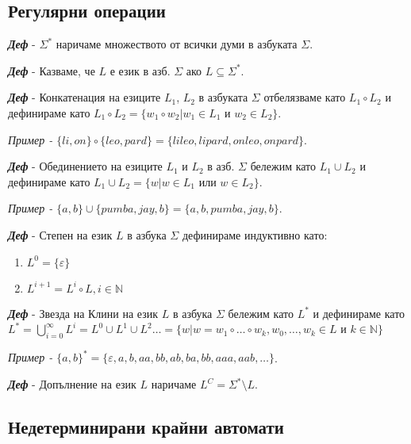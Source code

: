 \documentclass[fleqn,12pt]{article}
\begin{document}
\begin{flushleft}

\subsection{Регулярни операции}

\textit{\textbf{Деф}} - $\Sigma^*$ наричаме множеството от всички думи в азбуката $\Sigma$.

\textit{\textbf{Деф}} - Казваме, че $L$ е език в азб. $\Sigma$ ако $L \subseteq \Sigma^*$.

\textit{\textbf{Деф}} - Конкатенация на езиците $L_1$, $L_2$ в азбуката $\Sigma$ отбелязваме като $L_1 \circ L_2$ и дефинираме като $L_1 \circ L_2 = \{w_1 \circ w_2 | w_1 \in L_1 $ и $ w_2 \in L_2\}$.

\textit{Пример - $\{li, on\} \circ \{leo, pard\} = \{lileo, lipard, onleo, onpard\}$}.

\textit{\textbf{Деф}} - Обединението на езиците $L_1$ и $L_2$ в азб. $\Sigma$ бележим като $L_1 \cup L_2$ и дефинираме като $L_1 \cup L_2 = \{w | w \in L_1 $ или $ w \in L_2\}$.

\textit{Пример - $\{a, b\} \cup \{pumba, jay, b\} = \{a, b, pumba, jay, b\}$}.

\textit{\textbf{Деф}} - Степен на език $L$ в азбука $\Sigma$ дефинираме индуктивно като:
\begin{enumerate}
    \item $L^0 = \{\varepsilon\}$
    \item $L^{i+1} = L^i \circ L, i \in \mathbb{N}$
\end{enumerate}

\textit{\textbf{Деф}} - Звезда на Клини на език $L$ в азбука $\Sigma$ бележим като $L^*$ и дефинираме като $L^* = \bigcup\limits_{i=0}^{\infty} L^{i} = L^0 \cup L^1 \cup L^2 \dots = \{w | w = w_1 \circ \dots \circ w_k, w_0, \dots, w_k \in L $ и $ k \in \mathbb{N}\}$

\textit{Пример - $\{a, b\}^* = \{\varepsilon, a, b, aa, bb, ab, ba, bb, aaa, aab, \dots\}$}.

\textit{\textbf{Деф}} - Допълнение на език $L$ наричаме $L^C = \Sigma^* \setminus L$.

\subsection{Недетерминирани крайни автомати}


\end{flushleft}
\end{document}
